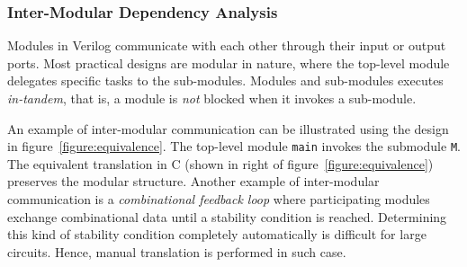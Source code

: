 \subsubsection{Inter-Modular Dependency Analysis}
%
Modules in Verilog communicate with each other through their input or output
ports. Most practical designs are modular in nature, where the top-level 
module delegates specific tasks to the sub-modules.
Modules and sub-modules executes \emph{in-tandem}, that is, a
module is \emph{not} blocked when it invokes a sub-module. 


An example of inter-modular communication can be illustrated
using the design in figure~\ref{figure:equivalence}.  The top-level 
module \texttt{main} invokes the submodule \texttt{M}.  
The equivalent translation in C (shown in right of figure~\ref{figure:equivalence}) 
preserves the modular structure. 
%
Another example of inter-modular communication is a \emph{combinational feedback loop} 
where participating modules exchange combinational data until a stability condition is reached.  
%
Determining this kind of stability condition completely automatically is difficult for large circuits.  Hence, manual translation is performed in such case.
